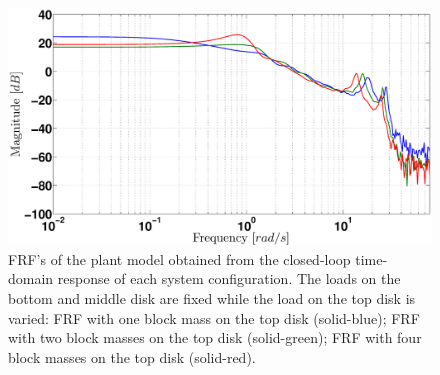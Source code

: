 \documentclass[a4paper, 10pt, conference]{ieeeconf}
\begin{document}
\begin{figure}
\centering
\includegraphics[width=\columnwidth]{pics/multi_freq_2}
\caption{FRF's of the plant model obtained from the closed-loop time-domain response of each system configuration. The loads on the bottom and middle disk are fixed while the load on the top disk is varied: FRF with one block mass on the top disk (solid-blue); FRF with two block masses on the top disk (solid-green); FRF with four block masses on the top disk (solid-red). }
\label{fig:freq}
\end{figure}
\end{document}
